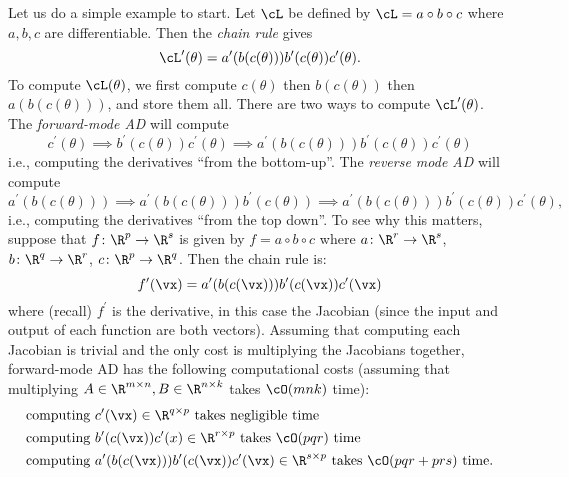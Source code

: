 \documentclass[../../book-main.tex]{subfiles}
\begin{document}
Let us do a simple example to start. Let \(\cL\) be defined by \(\cL = a \circ b \circ c\) where \(a, b, c\) are differentiable. Then the \textit{chain rule} gives
\begin{equation}
    \cL^{\prime}(\theta) = a^{\prime}(b(c(\theta)))b^{\prime}(c(\theta))c^{\prime}(\theta).
\end{equation}
To compute \(\cL(\theta)\), we first compute \(c(\theta)\) then \(b(c(\theta))\) then \(a(b(c(\theta)))\), and store them all. There are two ways to compute \(\cL^{\prime}(\theta)\). The \textit{forward-mode AD} will compute 
\begin{equation}
    c^{\prime}(\theta) \implies b^{\prime}(c(\theta))c^{\prime}(\theta) \implies a^{\prime}(b(c(\theta)))b^{\prime}(c(\theta))c^{\prime}(\theta)
\end{equation}
i.e., computing the derivatives ``from the bottom-up''. The \textit{reverse mode AD} will compute 
\begin{equation}
    a^{\prime}(b(c(\theta))) \implies a^{\prime}(b(c(\theta)))b^{\prime}(c(\theta)) \implies a^{\prime}(b(c(\theta)))b^{\prime}(c(\theta))c^{\prime}(\theta),
\end{equation}
i.e., computing the derivatives ``from the top down''. To see why this matters, suppose that \(f \colon \R^{p} \to \R^{s}\) is given by \(f = a \circ b \circ c\) where \(a \colon \R^{r} \to \R^{s}\), \(b \colon \R^{q} \to \R^{r}\), \(c \colon \R^{p} \to \R^{q}\). Then the chain rule is:
\begin{equation}
    f^{\prime}(\vx) = a^{\prime}(b(c(\vx)))b^{\prime}(c(\vx))c^{\prime}(\vx)
\end{equation}
where (recall) \(f^{\prime}\) is the derivative, in this case the Jacobian (since the input and output of each function are both vectors). Assuming that computing each Jacobian is trivial and the only cost is multiplying the Jacobians together, forward-mode AD has the following computational costs (assuming that multiplying \(A \in \R^{m \times n}, B \in \R^{n \times k}\) takes \(\cO(mnk)\) time):
\begin{align}
    &\text{computing}\ c^{\prime}(\vx) \in \R^{q \times p}\ \text{takes negligible time} \\
    &\text{computing}\ b^{\prime}(c(\vx))c^{\prime}(x) \in \R^{r \times p}\ \text{takes \(\cO(pqr)\) time} \\
    &\text{computing}\ a^{\prime}(b(c(\vx)))b^{\prime}(c(\vx))c^{\prime}(\vx) \in \R^{s \times p}\ \text{takes \(\cO(pqr + prs)\) time.}
\end{align}
\end{document}
